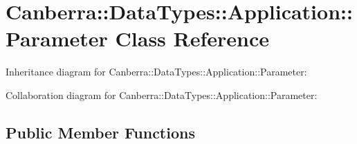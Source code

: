 \hypertarget{class_canberra_1_1_data_types_1_1_application_1_1_parameter}{}\section{Canberra\+:\+:Data\+Types\+:\+:Application\+:\+:Parameter Class Reference}
\label{class_canberra_1_1_data_types_1_1_application_1_1_parameter}


Inheritance diagram for Canberra\+:\+:Data\+Types\+:\+:Application\+:\+:Parameter\+:


Collaboration diagram for Canberra\+:\+:Data\+Types\+:\+:Application\+:\+:Parameter\+:
\subsection*{Public Member Functions}
